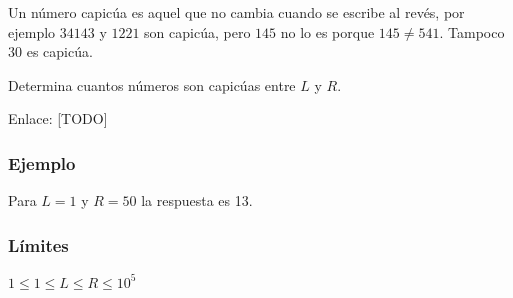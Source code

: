 Un número capicúa es aquel que no cambia cuando se escribe al revés, por ejemplo \(34143\) y \(1221\) son capicúa, pero \(145\) no lo es porque \(145\neq 541\). Tampoco \(30\) es capicúa.

Determina cuantos números son capicúas entre \(L\) y \(R\).

Enlace: [TODO]
\subsubsection*{Ejemplo}
Para \(L=1\) y \(R=50\) la respuesta es 13.
\subsubsection*{Límites}
\(1 \leq 1  \leq L \leq R \leq 10^5 \)

